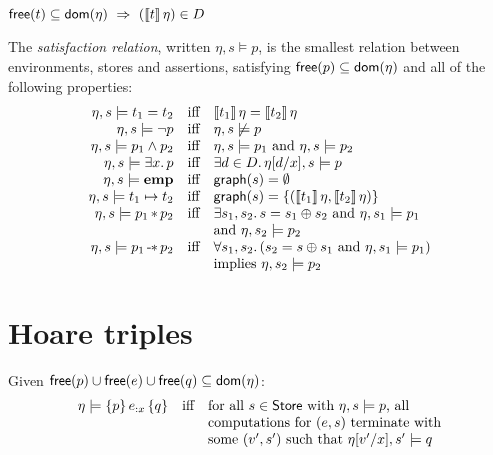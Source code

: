 \documentclass[12pt,a4paper]{article}
\newcommand{\emp}{\ensuremath{\mathbf{emp}}}
\begin{document}
\begin{lemma}
  $\free{t} \subseteq \dom{\eta} \ \Rightarrow\  (\semantic{t}\,\eta)\in D$
\end{lemma}

\begin{definition}
  The {\em satisfaction relation}, written $\eta,s \models p$, is the smallest relation between 
  environments, stores and assertions, satisfying $\mathsf{free}(p) \subseteq \mathsf{dom}(\eta)$ and all of the
  following properties:
  \[\begin{array}{rcl}
    \eta,s \models t_1 = t_2
    &\text{iff}& \semantic{t_1}\,\eta = \semantic{t_2}\,\eta \\
    \eta,s \models \neg p
    &\text{iff}& \eta,s \not\models p \\
    \eta,s \models p_1 \wedge p_2
    &\text{iff}& \eta,s \models p_1 \text{ and } \eta,s \models p_2 \\
    \eta,s \models \exists x.\,p
    &\text{iff}& \exists d \in D.\,\eta[d/x],s \models p \\
    \eta,s \models \emp
    &\text{iff}& \grph{s} = \emptyset \\
    \eta,s \models t_1 \mapsto t_2
    &\text{iff}& \grph{s} = \{(\semantic{t_1}\,\eta,\semantic{t_2}\,\eta)\} \\
    \eta,s \models p_1 \sepcon p_2
    &\text{iff}& \exists s_1,s_2.\,s=s_1 \oplus s_2 \text{ and } \eta,s_1 \models p_1 \\
    && \text{and } \eta,s_2 \models p_2 \\
    \eta,s \models p_1 \sepimp p_2
    &\text{iff}& \forall s_1,s_2.\,(s_2 = s \oplus s_1 \text{ and } \eta,s_1 \models p_1) \\
    && \text{implies } \eta,s_2 \models p_2
  \end{array}\]
\end{definition}


\section{Hoare triples}

\noindent Given $\mathsf{free}(p)\cup\mathsf{free}(e)\cup\mathsf{free}(q) \subseteq \mathsf{dom}(\eta)$:
\[\begin{array}{rcl}
  \eta \models \{p\}\,e_{:x}\,\{q\}
  &\text{iff}&
  \text{for all $s\in\mathsf{Store}$ with $\eta,s \models p$, all} \\
  && \text{computations for $(e,s)$ terminate with} \\
  && \text{some $(v',s')$ such that $\eta[v'/x],s' \models q$}
\end{array}\]
\end{document}
